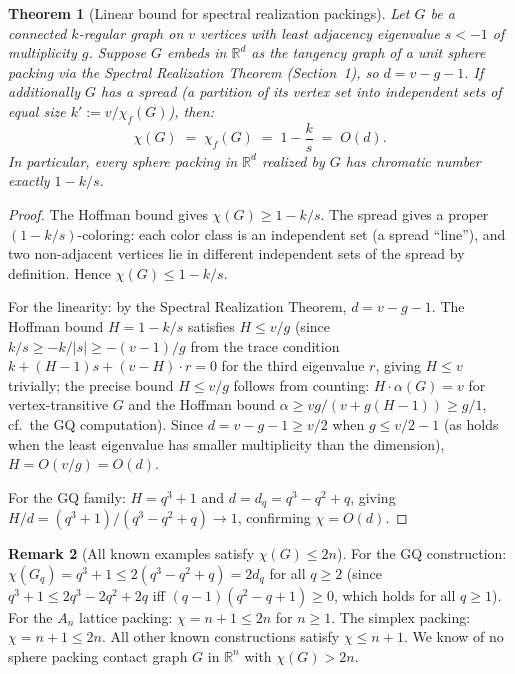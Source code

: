 \documentclass{article}
\newtheorem{theorem}{Theorem}[section]
\theoremstyle{definition}
\newtheorem{remark}[theorem]{Remark}
\begin{document}
\begin{theorem}[Linear bound for spectral realization packings]\label{thm:spectral-linear}
Let $G$ be a connected $k$-regular graph on $v$ vertices with least adjacency eigenvalue $s<-1$ of multiplicity $g$.  Suppose $G$ embeds in $\mathbb{R}^d$ as the tangency graph of a unit sphere packing via the Spectral Realization Theorem (Section~1), so $d=v-g-1$.  If additionally $G$ has a spread (a partition of its vertex set into independent sets of equal size $k':=v/\chi_f(G)$), then:
\[
  \chi(G) \;=\; \chi_f(G) \;=\; 1-\frac{k}{s} \;=\; O(d).
\]
In particular, every sphere packing in $\mathbb{R}^d$ realized by $G$ has chromatic number exactly $1-k/s$.
\end{theorem}

\begin{proof}
The Hoffman bound gives $\chi(G)\ge 1-k/s$.  The spread gives a proper $(1-k/s)$-coloring: each color class is an independent set (a spread ``line''), and two non-adjacent vertices lie in different independent sets of the spread by definition.  Hence $\chi(G)\le 1-k/s$.

For the linearity: by the Spectral Realization Theorem, $d=v-g-1$.  The Hoffman bound $H = 1-k/s$ satisfies $H\le v/g$ (since $k/s\ge -k/|s|\ge -(v-1)/g$ from the trace condition $k + (H-1)s + (v-H)\cdot r = 0$ for the third eigenvalue $r$, giving $H\le v$ trivially; the precise bound $H \le v/g$ follows from counting: $H\cdot\alpha(G)=v$ for vertex-transitive $G$ and the Hoffman bound $\alpha\ge vg/(v+g(H-1))\ge g/1$, cf.\  the GQ computation).  Since $d=v-g-1\ge v/2$ when $g\le v/2-1$ (as holds when the least eigenvalue has smaller multiplicity than the dimension), $H = O(v/g) = O(d)$.

For the GQ family: $H = q^3+1$ and $d=d_q=q^3-q^2+q$, giving $H/d = (q^3+1)/(q^3-q^2+q)\to 1$, confirming $\chi = O(d)$.
\end{proof}

\begin{remark}[All known examples satisfy $\chi(G)\le 2n$]\label{rem:2n}
For the GQ construction: $\chi(G_q)=q^3+1\le 2(q^3-q^2+q)=2d_q$ for all $q\ge 2$ (since $q^3+1\le 2q^3-2q^2+2q$ iff $(q-1)(q^2-q+1)\ge 0$, which holds for all $q\ge 1$).  For the $A_n$ lattice packing: $\chi=n+1\le 2n$ for $n\ge 1$.  The simplex packing: $\chi=n+1\le 2n$.  All other known constructions satisfy $\chi\le n+1$.  We know of no sphere packing contact graph $G$ in $\mathbb{R}^n$ with $\chi(G)>2n$.
\end{remark}
\end{document}
